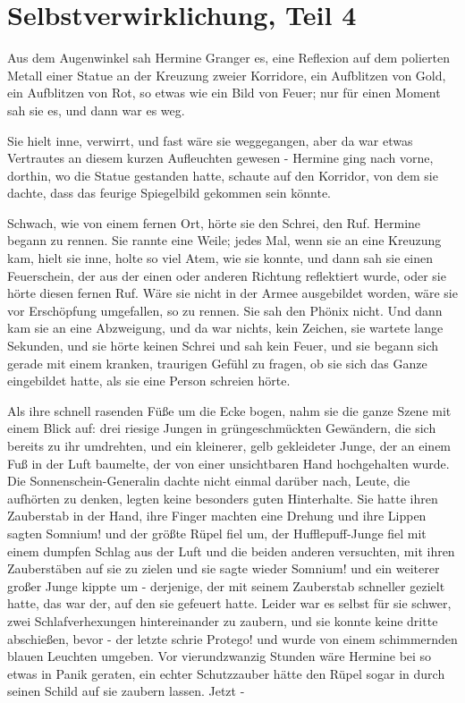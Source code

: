 \chapter{Selbstverwirklichung, Teil 4}

Aus dem Augenwinkel sah Hermine Granger es, eine Reflexion auf dem polierten
Metall einer Statue an der Kreuzung zweier Korridore, ein Aufblitzen von Gold,
ein Aufblitzen von Rot, so etwas wie ein Bild von Feuer; nur für einen Moment
sah sie es, und dann war es weg.

Sie hielt inne, verwirrt, und fast wäre sie weggegangen, aber da war etwas
Vertrautes an diesem kurzen Aufleuchten gewesen - Hermine ging nach vorne,
dorthin, wo die Statue gestanden hatte, schaute auf den Korridor, von dem sie
dachte, dass das feurige Spiegelbild gekommen sein könnte.

Schwach, wie von einem fernen Ort, hörte sie den Schrei, den Ruf. Hermine begann
zu rennen. Sie rannte eine Weile; jedes Mal, wenn sie an eine Kreuzung kam,
hielt sie inne, holte so viel Atem, wie sie konnte, und dann sah sie einen
Feuerschein, der aus der einen oder anderen Richtung reflektiert wurde, oder sie
hörte diesen fernen Ruf. Wäre sie nicht in der Armee ausgebildet worden, wäre
sie vor Erschöpfung umgefallen, so zu rennen. Sie sah den Phönix nicht. Und dann
kam sie an eine Abzweigung, und da war nichts, kein Zeichen, sie wartete lange
Sekunden, und sie hörte keinen Schrei und sah kein Feuer, und sie begann sich
gerade mit einem kranken, traurigen Gefühl zu fragen, ob sie sich das Ganze
eingebildet hatte, als sie eine Person schreien hörte.

Als ihre schnell rasenden Füße um die Ecke bogen, nahm sie die ganze Szene mit
einem Blick auf: drei riesige Jungen in grüngeschmückten Gewändern, die sich
bereits zu ihr umdrehten, und ein kleinerer, gelb gekleideter Junge, der an
einem Fuß in der Luft baumelte, der von einer unsichtbaren Hand hochgehalten
wurde. Die Sonnenschein-Generalin dachte nicht einmal darüber nach, Leute, die
aufhörten zu denken, legten keine besonders guten Hinterhalte. Sie hatte ihren
Zauberstab in der Hand, ihre Finger machten eine Drehung und ihre Lippen sagten
\glqq{}Somnium!\grqq{} und der größte Rüpel fiel um, der Hufflepuff-Junge fiel
mit einem dumpfen Schlag aus der Luft und die beiden anderen versuchten, mit
ihren Zauberstäben auf sie zu zielen und sie sagte wieder \glqq{}Somnium!\grqq{}
und ein weiterer großer Junge kippte um - derjenige, der mit seinem Zauberstab
schneller gezielt hatte, das war der, auf den sie gefeuert hatte. Leider war es
selbst für sie schwer, zwei Schlafverhexungen hintereinander zu zaubern, und sie
konnte keine dritte abschießen, bevor - der letzte schrie \glqq{}Protego!\grqq{}
und wurde von einem schimmernden blauen Leuchten umgeben. Vor vierundzwanzig
Stunden wäre Hermine bei so etwas in Panik geraten, ein echter Schutzzauber
hätte den Rüpel sogar in durch seinen Schild auf sie zaubern lassen. Jetzt -

